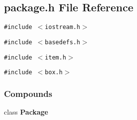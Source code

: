 \subsection{package.h File Reference}
\label{package.h}
{\tt \#include $<$iostream.h$>$}\par
{\tt \#include $<$basedefs.h$>$}\par
{\tt \#include $<$item.h$>$}\par
{\tt \#include $<$box.h$>$}\par
\subsubsection*{Compounds}
\begin{CompactItemize}
\item 
class {\bf Package}
\end{CompactItemize}
